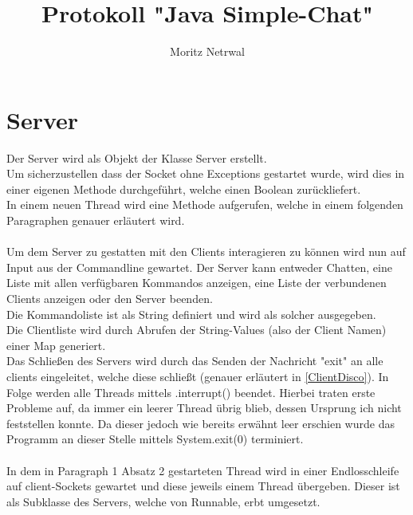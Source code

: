 \documentclass{article}
\title{Protokoll "Java Simple-Chat"}
\author{Moritz Netrwal}
\begin{document}
\bgroup
\date{\vspace{-5ex}}
\maketitle
\egroup
\rhead{ }\lhead{ }

\newpage

\tableofcontents
\newpage
{}

\section{Server}


Der Server wird als Objekt der Klasse Server erstellt.\\
Um sicherzustellen dass der Socket ohne Exceptions gestartet wurde, wird dies in einer eigenen Methode durchgeführt, welche einen Boolean zurückliefert.\\
In einem neuen Thread wird eine Methode aufgerufen, welche in einem folgenden Paragraphen genauer erläutert wird.\\
\\
Um dem Server zu gestatten mit den Clients interagieren zu können wird nun auf Input aus der Commandline gewartet. Der Server kann entweder Chatten, eine Liste mit allen verfügbaren Kommandos anzeigen, eine Liste der verbundenen Clients anzeigen oder den Server beenden.\\
Die Kommandoliste ist als String definiert und wird als solcher ausgegeben.\\
Die Clientliste wird durch Abrufen der String-Values (also der Client Namen) einer Map generiert.\\
Das Schließen des Servers wird durch das Senden der Nachricht "exit" an alle clients eingeleitet, welche diese schließt (genauer erläutert in \ref{ClientDisco}). In Folge werden alle Threads mittels .interrupt() beendet. Hierbei traten erste Probleme auf, da immer ein leerer Thread übrig blieb, dessen Ursprung ich nicht feststellen konnte. Da dieser jedoch wie bereits erwähnt leer erschien wurde das Programm an dieser Stelle mittels System.exit(0) terminiert.\\
\\
In dem in Paragraph 1 Absatz 2 gestarteten Thread wird in einer Endlosschleife auf client-Sockets gewartet und diese jeweils einem Thread übergeben. Dieser ist als Subklasse des Servers, welche von Runnable, erbt umgesetzt.\\
\\
\end{document}
